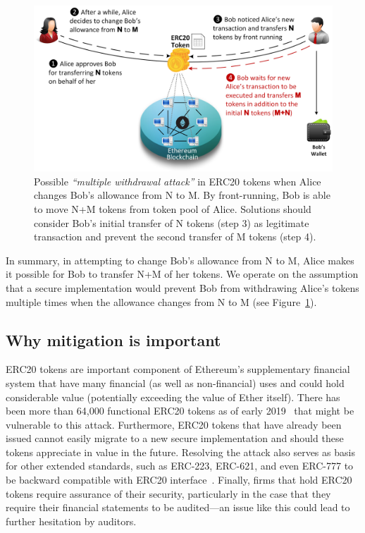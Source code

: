 \begin{figure}[ht]
	\centering
	\includegraphics[width=1.0\linewidth]{figures/multiple_withdrawal_02.png}
	\caption{Possible \textit{``multiple withdrawal attack''} in ERC20 tokens when Alice changes Bob's allowance from N to M. By front-running, Bob is able to move N+M tokens from token pool of Alice. Solutions should consider Bob's initial transfer of N tokens (step 3) as legitimate transaction and prevent the second transfer of M tokens (step 4).\label{fig:mwa}}
\end{figure}

In summary, in attempting to change Bob's allowance from N to M, Alice makes it possible for Bob to transfer N+M of her tokens. We operate on the assumption that a secure implementation would prevent Bob from withdrawing Alice's tokens multiple times when the allowance changes from N to M (see Figure~\ref{fig:mwa}).

\subsection{Why mitigation is important}
ERC20 tokens are important component of Ethereum's supplementary financial system that have many financial (as well as non-financial) uses and could hold considerable value (potentially exceeding the value of Ether itself). There has been more than 64,000 functional ERC20 tokens as of early 2019~\cite{victormeasuring} that might be vulnerable to this attack. Furthermore, ERC20 tokens that have already been issued cannot easily migrate to a new secure implementation and should these tokens appreciate in value in the future. Resolving the attack also serves as basis for other extended standards, such as ERC-223, ERC-621, and even ERC-777 to be backward compatible with ERC20 interface~\cite{frowis2018detecting}. Finally, firms that hold ERC20 tokens require assurance of their security, particularly in the case that they require their financial statements to be audited---an issue like this could lead to further hesitation by auditors.

